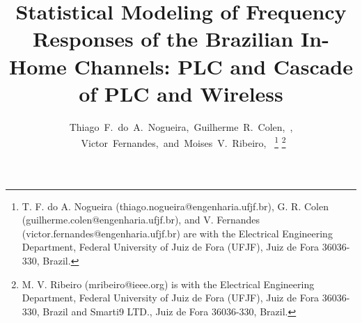 \documentclass[journal]{IEEEtran}
\begin{document}
\title{Statistical Modeling of Frequency Responses of the Brazilian In-Home Channels: PLC and Cascade of PLC and Wireless}

\author{Thiago~F.~do~A.~Nogueira,~Guilherme~R.~Colen,~,
	~Victor~Fernandes,~and~Moises~V.~Ribeiro,~
\thanks{T. F. do A. Nogueira (thiago.nogueira@engenharia.ufjf.br), G. R. Colen (guilherme.colen@engenharia.ufjf.br), and V. Fernandes (victor.fernandes@engenharia.ufjf.br) are with the Electrical Engineering Department, Federal University of Juiz	de Fora (UFJF), Juiz de Fora 36036-330, Brazil.}
\thanks{M. V. Ribeiro (mribeiro@ieee.org) is with the Electrical Engineering
	Department, Federal University of Juiz de Fora (UFJF), Juiz de Fora 36036-330, Brazil and Smarti9 LTD., Juiz de Fora 36036-330, Brazil.}}


\maketitle

\begin{abstract}

\end{abstract}
\end{document}
